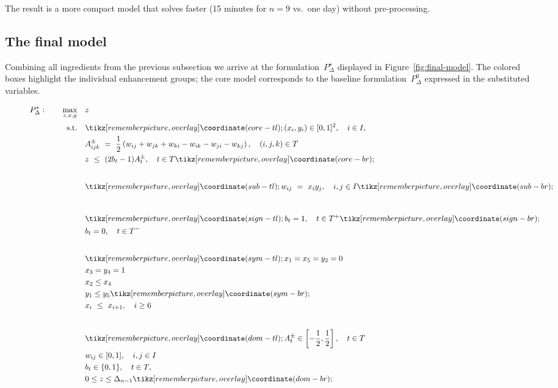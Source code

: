 \documentclass[11pt,a4paper]{article}
\newcommand{\tikzmark}[1]{%
  \tikz[remember picture,overlay]\coordinate (#1);%
}
\theoremstyle{plain}
\theoremstyle{definition}
\theoremstyle{remark}
\begin{document}
  The result is a more compact model that solves faster (15 minutes for $n=9$ vs.\ one day) without pre-processing.

\subsection{The final model}\label{sec:final-model}

Combining all ingredients from the previous subsection we arrive at the formulation~$P_\Delta^\star$ displayed in Figure~\ref{fig:final-model}.
The colored boxes highlight the individual enhancement groups; the core model corresponds to the baseline formulation~$P_\Delta^0$ expressed in the substituted variables.

  \begin{figure}[h]
    \centering
    
    \begin{align*}
      P_\Delta^\star:\qquad \max_{z,x,y}\quad & z \\[2pt]
      \text{s.t.}\quad
      & \tikzmark{core-tl}(x_i,y_i)\in[0,1]^2,\quad i\in I,\\
      & A_{ijk}^{\pm}\ =\ \frac{1}{2}\left(
        w_{ij} + w_{jk} + w_{ki} - w_{ik} - w_{ji} - w_{kj}
        \right),\quad (i,j,k)\in T\\
      & z\ \le\  (2b_t - 1) A_t^\pm,\quad t\in T\tikzmark{core-br}\\[20pt]
      & \tikzmark{sub-tl}w_{ij}\ =\ x_i y_j,\quad i,j\in I\tikzmark{sub-br}\\[25pt]
      & \tikzmark{sign-tl}b_t=1,\quad t\in T^+\tikzmark{sign-br}\\
      & b_t=0,\quad t\in T^-\\[20pt]
      & \tikzmark{sym-tl}x_1 = x_5 = y_2 = 0\\
      & x_3 = y_4 = 1\\
      & x_2 \le x_4\\
      & y_1 \le y_5\tikzmark{sym-br}\\
      & x_i\ \le\ x_{i+1},\quad i\ge 6\\[20pt]
      & \tikzmark{dom-tl}A_t^{\pm}\in\left[-\frac{1}{2}, \frac{1}{2}\right],\quad t\in T\\
      & w_{ij}\in[0,1],\quad i,j\in I\\
      & b_t \in \{0,1\}, \quad t\in T,\\
      &  0 \le z \le \Delta_{n-1}\tikzmark{dom-br}
    \end{align*}


\end{figure}
\end{document}
